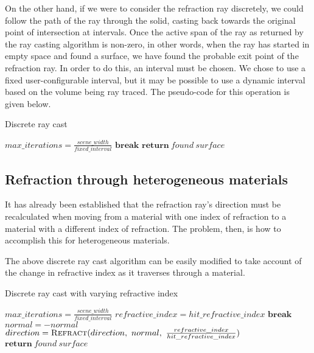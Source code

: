 On the other hand, if we were to consider the refraction ray discretely, we could follow the path of the ray through the solid, casting back towards the original point of intersection at intervals. Once the active span of the ray as returned by the ray casting algorithm is non-zero, in other words, when the ray has started in empty space and found a surface, we have found the probable exit point of the refraction ray. In order to do this, an interval must be chosen. We chose to use a fixed user-configurable interval, but it may be possible to use a dynamic interval based on the volume being ray traced. The pseudo-code for this operation is given below.

\begin{algorithm}
\caption{Discrete ray cast}
\label{alg:discrete_raycast}
\begin{algorithmic}[1]
	\State $max\_iterations = \frac{scene\_width}{fixed\_interval}$
		\State {}
		 
			\State $\textbf{break}$
		\EndIf
	\EndFor
	\State $\textbf{return}~found~surface$
\EndProcedure
\end{algorithmic}
\end{algorithm}

\subsection{Refraction through heterogeneous materials}
It has already been established that the refraction ray's direction must be recalculated when moving from a material with one index of refraction to a material with a different index of refraction. The problem, then, is how to accomplish this for heterogeneous materials.

The above discrete ray cast algorithm can be easily modified to take account of the change in refractive index as it traverses through a material.

\begin{algorithm}
\caption{Discrete ray cast with varying refractive index}
\label{alg:discrete_raycast_heterogeneous}
\begin{algorithmic}[1]
	\State $max\_iterations = \frac{scene\_width}{fixed\_interval}$
	\State $refractive\_index = hit\_refractive\_index$
		\State {}
		 
			\State $\textbf{break}$
		\EndIf
			 
				\State $normal = -normal$
			\EndIf
			\State $direction = \Call{Refract}{direction,~normal,~\frac{refractive\_index}{hit\_refractive\_index}}$
		\EndIf
	\EndFor
	\State $\textbf{return}~found~surface$
\EndProcedure
\end{algorithmic}
\end{algorithm}

